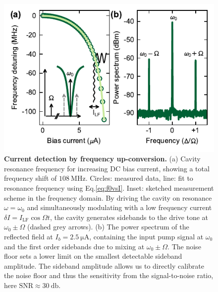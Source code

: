 \begin{figure}
	\centering
	\includegraphics[]{chapter-currentdetection/figures/Figure2}
	\caption{
		\textbf{Current detection by frequency up-conversion.}
		(a) Cavity resonance frequency for increasing DC bias current, showing a total frequency shift of $\SI{108}{\mega\hertz}$.
		Circles: measured data, line: fit to resonance frequency using Eq.\eqref{eq:f0vsI}.
		Inset: sketched measurement scheme in the frequency domain.
		By driving the cavity on resonance $\omega = \omega_0$ and simultaneously modulating with a low frequency current $\delta I = I_\text{LF}\cos\Omega t$, the cavity generates sidebands to the drive tone at $\omega_0 \pm \Omega$ (dashed grey arrows).
		(b) The power spectrum of the reflected field at $I_b=\SI{2.5}{\micro\ampere}$, containing the input pump signal at $\omega_0$ and the first order sidebands due to mixing at $\omega_0 \pm \Omega$.
		The noise floor sets a lower limit on the smallest detectable sideband amplitude.
		The sideband amplitude allows us to directly calibrate the noise floor and thus the sensitivity from the signal-to-noise ratio, here $\text{SNR}\approx\SI{30}{\decibel}$.
		\label{fig:figure2}
	}
\end{figure}

